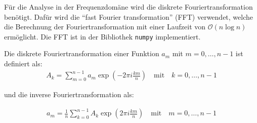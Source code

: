 \documentclass[main.tex]{subfiles}
\begin{document}
Für die Analyse in der Frequenzdomäne wird die diskrete Fouriertransformation
benötigt. Dafür wird die \enquote{fast Fourier transformation} (FFT) verwendet,
welche die Berechnung der Fouriertransformation mit einer Laufzeit von
$\mathcal{O}(n \log n)$ ermöglicht. Die FFT ist in der Bibliothek
\texttt{numpy} \cite{numpy-fft} implementiert.

Die diskrete Fouriertransformation einer Funktion $a_m$ mit $m = 0, \dots, n-1$
ist definiert als:
\begin{align}
    A_k = \sum_{m=0}^{n-1} a_m \exp(-2 \pi i\frac{ k m}{n}) \quad \text{mit}
    \quad k = 0, \dots, n-1
\end{align}

und die inverse Fouriertransformation als:

\begin{align}
    a_m = \frac{1}{n} \sum_{k=0}^{n-1} A_k \exp(2 \pi i\frac{ k m}{n}) \quad
    \text{mit} \quad m = 0, \dots, n-1
\end{align}




\end{document}
